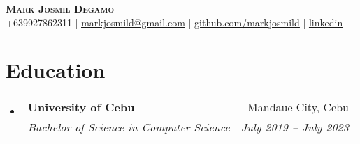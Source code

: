 \documentclass[letterpaper,11pt]{article}
\makeatletter
\newcommand{\resumeSubheading}[4]{
  \vspace{-2pt}\item
    \begin{tabular*}{0.97\textwidth}[t]{l@{\extracolsep{\fill}}r}
      \textbf{#1} & #2 \\
      \textit{\small#3} & \textit{\small #4} \\
    \end{tabular*}\vspace{-7pt}
}
\newcommand{\resumeSubHeadingListStart}{\begin{itemize}[leftmargin=0.15in, label={}]}
\newcommand{\resumeSubHeadingListEnd}{\end{itemize}}
\makeatother
\begin{document}

\begin{center}
    \textbf{\Huge \scshape Mark Josmil Degamo} \\ \vspace{1pt}
    \small +639927862311 $|$ 
    \href{mailto:markjosmild@gmail.com}
    {\underline{markjosmild@gmail.com}} $|$ 
    \href{https://www.linkedin.com/in/mark-josmil-degamo-97a05a273/}
    {\underline{github.com/markjosmild}} $|$ 
    \href{https://www.linkedin.com/in/mark-josmil-degamo-97a05a273/}
    {\underline{linkedin}}  
\end{center}

\section{Education}
  \resumeSubHeadingListStart
    \resumeSubheading
      {University of Cebu}{Mandaue City, Cebu}
      {Bachelor of Science in Computer Science}{July 2019 -- July 2023}
  \resumeSubHeadingListEnd
  

\end{document}
